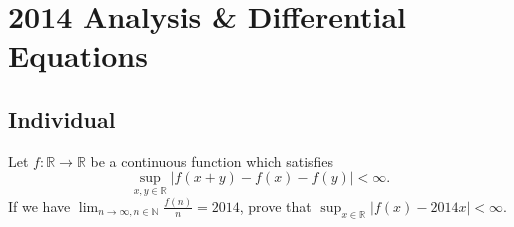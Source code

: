 \section{2014 Analysis \& Differential Equations}

\subsection{Individual}

\begin{exercise}
\label{analysis:2014:1}
Let $f:\mathbb{R}\to\mathbb{R}$ be a continuous function which satisfies
\[
\sup_{x,y\in\mathbb{R}}|f(x+y)-f(x)-f(y)| < \infty.
\]
If we have $\lim_{n\to\infty,n\in\mathbb{N}}\frac{f(n)}{n} = 2014$, prove that $\sup_{x\in\mathbb{R}}|f(x)-2014x| < \infty$.
\end{exercise}

